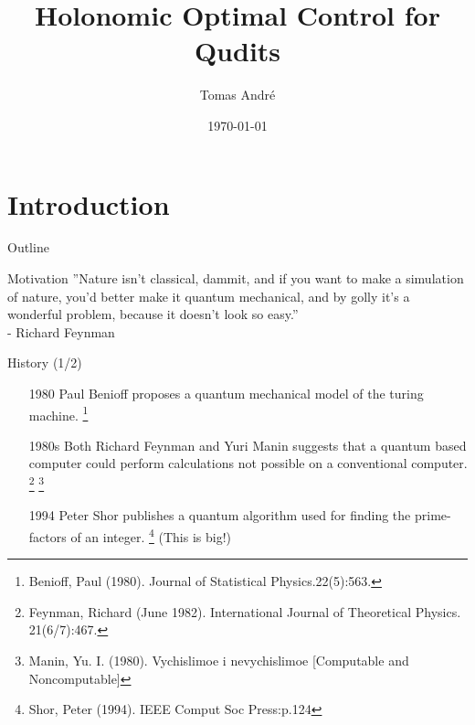 \documentclass[t]{beamer}
\title[Holonomic Optimal Control for Qudits]{Holonomic Optimal Control for Qudits}
\author{ Tomas André}
\institute{ Uppsala University }
\date{\today}
\begin{document}
\begin{frame}
  \titlepage
\end{frame}


\section{Introduction}
\begin{frame}
\tableofcontents
\end{frame}

\begin{frame}{Outline}
\tableofcontents[ 
currentsubsection, 
hideothersubsections, 
sectionstyle=show/shaded, 
subsectionstyle=show/shaded, 
] 
\end{frame}

\begin{frame}[c]{Motivation}
''Nature isn't classical, dammit, and if you want to make a simulation of nature, you'd better make it quantum mechanical, and by golly it's a wonderful problem, because it doesn't look so easy.'' 
\\- Richard Feynman
\end{frame}

\begin{frame}{History (1/2)}


\begin{itemize}
\item[1980] Paul Benioff proposes a quantum mechanical model of the turing machine. 
\footnote{{\scriptsize Benioff, Paul (1980). Journal of Statistical Physics.22(5):563.}}


\item[1980s] Both Richard Feynman and Yuri Manin suggests that a quantum based computer could perform calculations not possible on a conventional computer.
\footnote{\scriptsize Feynman, Richard (June 1982). International Journal of Theoretical Physics. 21(6/7):467.}
\footnote{\scriptsize Manin, Yu. I. (1980). Vychislimoe i nevychislimoe [Computable and Noncomputable]}


\item[1994] Peter Shor publishes a quantum algorithm used for finding the prime-factors of an integer.
\footnote{\scriptsize Shor, Peter (1994). IEEE Comput Soc Press:p.124} (This is big!) 


\end{itemize}
\end{frame}
\end{document}
